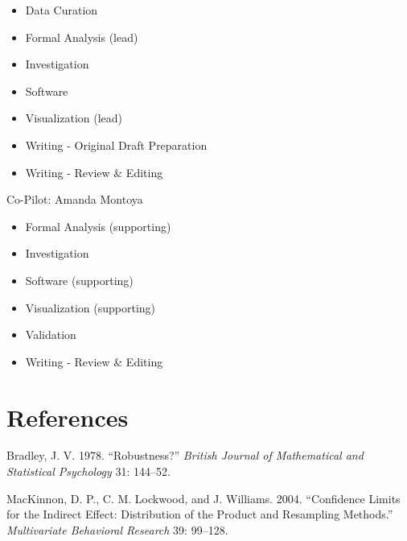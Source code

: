 \documentclass[10,a4paperpaper,]{article}
\begin{document}
\begin{itemize}
\tightlist
\item
  Data Curation\\
\item
  Formal Analysis (lead)\\
\item
  Investigation\\
\item
  Software\\
\item
  Visualization (lead)\\
\item
  Writing - Original Draft Preparation\\
\item
  Writing - Review \& Editing
\end{itemize}

Co-Pilot: Amanda Montoya

\begin{itemize}
\tightlist
\item
  Formal Analysis (supporting)\\
\item
  Investigation\\
\item
  Software (supporting)\\
\item
  Visualization (supporting)\\
\item
  Validation\\
\item
  Writing - Review \& Editing
\end{itemize}

\newpage

\section*{References}

\begingroup
\hphantom{x} \setlength{\parindent}{-0.5in} \setlength{\leftskip}{0.5in}

\hypertarget{refs}{}
\hypertarget{ref-bradley78}{}
Bradley, J. V. 1978. ``Robustness?'' \emph{British Journal of
Mathematical and Statistical Psychology} 31: 144--52.

\hypertarget{ref-mackinnon04}{}
MacKinnon, D. P., C. M. Lockwood, and J. Williams. 2004. ``Confidence
Limits for the Indirect Effect: Distribution of the Product and
Resampling Methods.'' \emph{Multivariate Behavioral Research} 39:
99--128.
\end{document}
